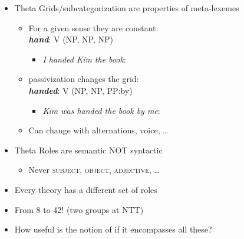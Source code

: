 \documentclass[headrule,footrule]{foils}
\begin{document}
\begin{itemize}
\item Theta Grids/subcategorization are properties of meta-lexemes
  \begin{itemize}
  \item For a given sense they are constant:
    \\ \textbf{\textit{hand}}: V  (NP, NP, NP)
    \begin{itemize}
    \item \textit{I handed Kim the book}: 
    \end{itemize}
  \item passivization changes the grid: 
      \\ \textbf{\textit{handed}}:  V  (NP, NP, PP:by)
  \begin{itemize}
    \item \textit{Kim was handed the book by me}: 
    \end{itemize}
  \item Can change with alternations, voice, \ldots
  \end{itemize}
\item Theta Roles are semantic NOT syntactic
  \begin{itemize}
  \item Never \textsc{subject, object, adjective, \ldots}
  \end{itemize}
\end{itemize}


\begin{itemize}
\item  Every theory has a different set of roles

\item  From 8 to 42! (two groups at NTT) 
\item  How useful is the notion of  if it 
encompasses all these?
\begin{exe}
\ex{}
\ex{}
\ex{}
\ex{}
\end{exe}
\end{itemize}
\end{document}
